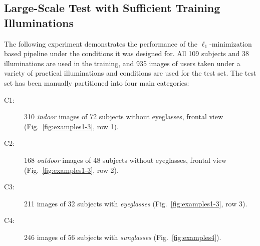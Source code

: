\subsection{Large-Scale Test with Sufficient Training
Illuminations} The following experiment demonstrates the performance
of the $\ell_1$-minimization based pipeline under the conditions it
was designed for.  All 109 subjects and 38 illuminations
are used in the training, and 935 images of users taken under a variety of
practical illuminations and conditions are used for the test set. 
The test set has been manually partitioned into four main categories:
\begin{description}
\item[C1:] 310 \emph{indoor} images of 72 subjects without
    eyeglasses, frontal view
    (Fig.~\ref{fig:examples1-3}, row 1).
\item[C2:] 168 \emph{outdoor} images of 48 subjects without
    eyeglasses, frontal view
    (Fig.~\ref{fig:examples1-3}, row 2).
\item[C3:] 211 images of 32 subjects with \emph{eyeglasses}
    (Fig.~\ref{fig:examples1-3}, row 3).
\item[C4:] 246 images of 56 subjects with \emph{sunglasses}
    (Fig.~\ref{fig:examples4}).
\end{description}
\renewcommand{\tempwidth}{0.1667\textwidth}
